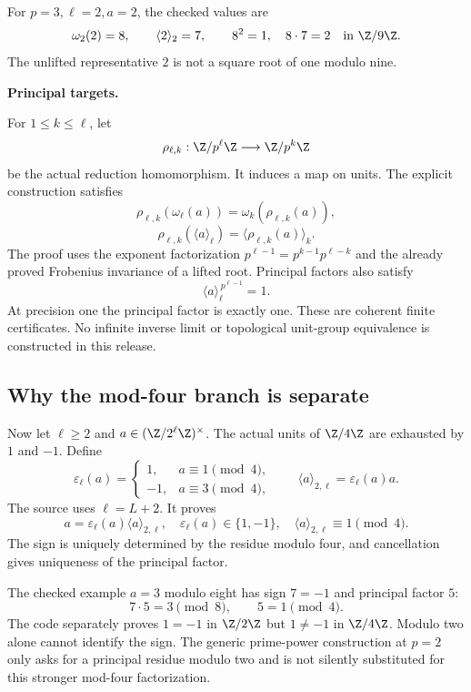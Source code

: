 For $p=3,\ell=2,a=2$, the checked values are
\[
 \omega_2(2)=8,\qquad \langle2\rangle_2=7,\qquad
 8^2=1,\quad8\cdot7=2\quad\text{in }\Z/9\Z.
\]
The unlifted representative $2$ is not a square root of one modulo nine.

\textbf{Principal targets.}\par
{}\par
{}\par
{}
\par\medskip
{}
For $1\leq k\leq\ell$, let
\[
 \rho_{\ell,k}:\Z/p^\ell\Z\longrightarrow\Z/p^k\Z
\]
be the actual reduction homomorphism. It induces a map on units. The explicit construction satisfies
\[
 \boxed{\rho_{\ell,k}(\omega_\ell(a))
 =\omega_k(\rho_{\ell,k}(a)),}
\]
\[
 \boxed{\rho_{\ell,k}(\langle a\rangle_\ell)
 =\langle\rho_{\ell,k}(a)\rangle_k.}
\]
The proof uses the exponent factorization
$p^{\ell-1}=p^{k-1}p^{\ell-k}$ and the already proved Frobenius invariance of a lifted root. Principal factors also satisfy
\[
 \langle a\rangle_\ell^{\,p^{\ell-1}}=1.
\]
At precision one the principal factor is exactly one. These are coherent finite certificates. No infinite inverse limit or topological unit-group equivalence is constructed in this release.

\subsection*{Why the mod-four branch is separate}
Now let $\ell\geq2$ and $a\in(\Z/2^\ell\Z)^\times$. The actual units of $\Z/4\Z$ are exhausted by $1$ and $-1$. Define
\[
 \varepsilon_\ell(a)=
 \begin{cases}1,&a\equiv1\pmod4,\\-1,&a\equiv3\pmod4,\end{cases}
 \qquad
 \langle a\rangle_{2,\ell}=\varepsilon_\ell(a)a.
\]
The source uses $\ell=L+2$. It proves
\[
 \boxed{a=\varepsilon_\ell(a)\langle a\rangle_{2,\ell},\quad
 \varepsilon_\ell(a)\in\{1,-1\},\quad
 \langle a\rangle_{2,\ell}\equiv1\pmod4.}
\]
The sign is uniquely determined by the residue modulo four, and cancellation gives uniqueness of the principal factor.

The checked example $a=3$ modulo eight has sign $7=-1$ and principal factor $5$:
\[
 7\cdot5=3\pmod8,\qquad5=1\pmod4.
\]
The code separately proves $1=-1$ in $\Z/2\Z$ but $1\neq-1$ in $\Z/4\Z$. Modulo two alone cannot identify the sign. The generic prime-power construction at $p=2$ only asks for a principal residue modulo two and is not silently substituted for this stronger mod-four factorization.

